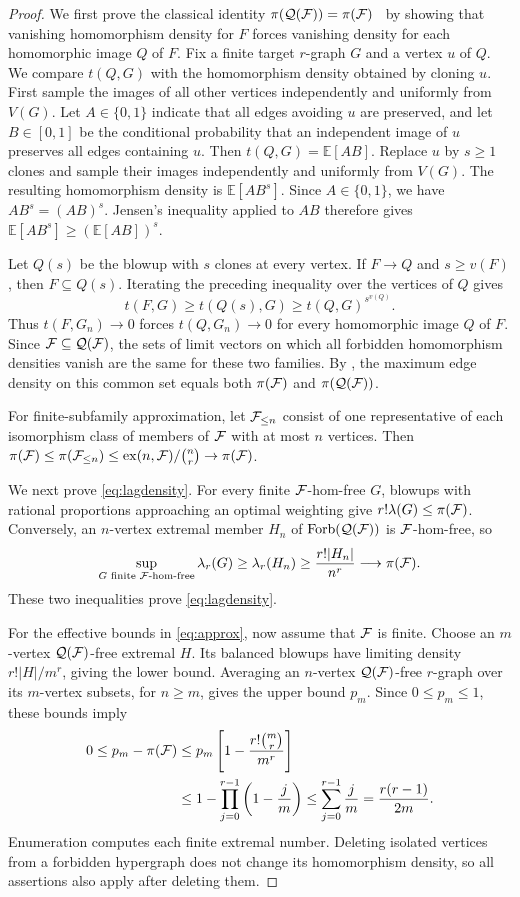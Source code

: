 \documentclass[10pt]{article}
\numberwithin{equation}{section}
\theoremstyle{definition}
\newcommand{\cQ}{\mathcal Q}\newcommand{\cR}{\mathcal R}\newcommand{\cS}{\mathcal S}
\newcommand{\Forb}{\operatorname{Forb}}\newcommand{\Ext}{\operatorname{Ext}}
\newcommand{\ex}{\operatorname{ex}}\newcommand{\supp}{\operatorname{supp}}
\begin{document}
\begin{proof}
We first prove the classical identity $\pi(\cQ(\cF))=\pi(\cF)$~\cite{BrownSimonovits1984,Pikhurko2014,Keevash2011} by showing that vanishing homomorphism density for $F$ forces vanishing density for each homomorphic image $Q$ of $F$. Fix a finite target $r$-graph $G$ and a vertex $u$ of $Q$. We compare $t(Q,G)$ with the homomorphism density obtained by cloning $u$. First sample the images of all other vertices independently and uniformly from $V(G)$. Let $A\in\{0,1\}$ indicate that all edges avoiding $u$ are preserved, and let $B\in[0,1]$ be the conditional probability that an independent image of $u$ preserves all edges containing $u$. Then $t(Q,G)=\mathbb E[AB]$. Replace $u$ by $s\ge1$ clones and sample their images independently and uniformly from $V(G)$. The resulting homomorphism density is $\mathbb E[AB^s]$. Since $A\in\{0,1\}$, we have $AB^s=(AB)^s$. Jensen's inequality applied to $AB$ therefore gives $\mathbb E[AB^s]\ge(\mathbb E[AB])^s$.

Let $Q(s)$ be the blowup with $s$ clones at every vertex. If $F\to Q$ and $s\ge v(F)$, then $F\subseteq Q(s)$. Iterating the preceding inequality over the vertices of $Q$ gives
\[
 t(F,G)\ge t(Q(s),G)\ge t(Q,G)^{s^{v(Q)}}.
\]
Thus $t(F,G_n)\to0$ forces $t(Q,G_n)\to0$ for every homomorphic image $Q$ of $F$. Since $\cF\subseteq\cQ(\cF)$, the sets of limit vectors on which all forbidden homomorphism densities vanish are the same for these two families. By , the maximum edge density on this common set equals both $\pi(\mathcal F)$ and $\pi(\cQ(\cF))$.

For finite-subfamily approximation, let $\mathcal F_{\le n}$ consist of one representative of each isomorphism class of members of $\mathcal F$ with at most $n$ vertices. Then $\pi(\cF)\le\pi(\cF_{\le n})\le\ex(n,\cF)/\binom nr\to\pi(\cF)$.

We next prove \eqref{eq:lagdensity}. For every finite $\mathcal F$-hom-free $G$, blowups with rational proportions approaching an optimal weighting give $r!\lambda(G)\le\pi(\mathcal F)$. Conversely, an $n$-vertex extremal member $H_n$ of $\Forb(\cQ(\cF))$ is $\mathcal F$-hom-free, so
\[
 \sup_{G\text{ finite }\mathcal F\text{-hom-free}}\lambda_r(G)
 \ge\lambda_r(H_n)\ge\frac{r!|H_n|}{n^r}
 \longrightarrow\pi(\mathcal F).
\]
These two inequalities prove \eqref{eq:lagdensity}.

For the effective bounds in \eqref{eq:approx}, now assume that $\mathcal F$ is finite. Choose an $m$-vertex $\cQ(\cF)$-free extremal $H$. Its balanced blowups have limiting density $r!|H|/m^r$, giving the lower bound. Averaging an $n$-vertex $\cQ(\cF)$-free $r$-graph over its $m$-vertex subsets, for $n\ge m$, gives the upper bound $p_m$. Since $0\le p_m\le1$, these bounds imply
\[
 \begin{aligned}
 0\le p_m-\pi(\mathcal F)
 &\le p_m\left[1-\frac{r!\binom mr}{m^r}\right]\\
 &\le1-\prod_{j=0}^{r-1}\left(1-\frac jm\right)
 \le\sum_{j=0}^{r-1}\frac jm=\frac{r(r-1)}{2m}.
 \end{aligned}
\]
Enumeration computes each finite extremal number. Deleting isolated vertices from a forbidden hypergraph does not change its homomorphism density, so all assertions also apply after deleting them.
\end{proof}
\end{document}
